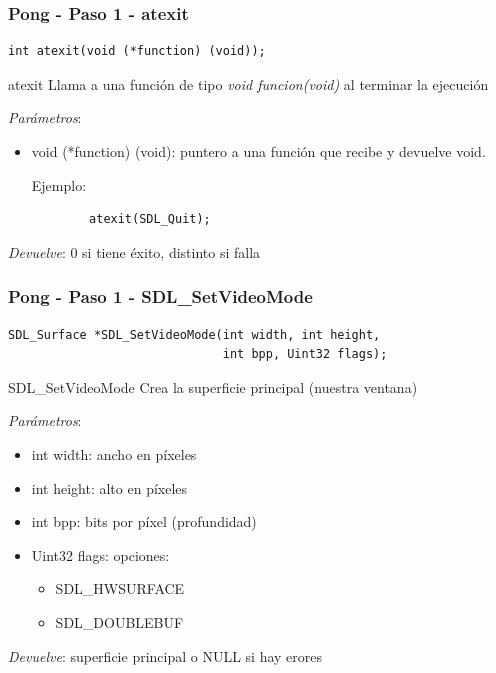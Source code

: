 \begin{frame}[fragile]
    \frametitle{Pong - Paso 1 - atexit}
	
\begin{verbatim}
int atexit(void (*function) (void));
\end{verbatim}

    \begin{block}{atexit}
	Llama a una función de tipo \emph{void funcion(void)} al terminar la ejecución
	
	\emph{Parámetros}:
	\begin{itemize}
	    \item void (*function) (void): puntero a una función que recibe y devuelve void.
	    
	    Ejemplo:
	    \begin{verbatim}
	    atexit(SDL_Quit);
	    \end{verbatim}
	\end{itemize}
	
	\emph{Devuelve}: $0$ si tiene éxito, distinto si falla
    \end{block}

\end{frame}

\begin{frame}[fragile]
    \frametitle{Pong - Paso 1 - SDL\_SetVideoMode}
	
\begin{verbatim}
SDL_Surface *SDL_SetVideoMode(int width, int height,
                              int bpp, Uint32 flags);
\end{verbatim}

    \begin{block}{SDL\_SetVideoMode}
	Crea la superficie principal (nuestra ventana)
	
	\emph{Parámetros}:
	\begin{itemize}
	    \item int width: ancho en píxeles
	    \item int height: alto en píxeles
	    \item int bpp: bits por píxel (profundidad)
	    \item Uint32 flags: opciones:
	    \begin{itemize}
		    \item SDL\_HWSURFACE
		    \item SDL\_DOUBLEBUF
	    \end{itemize}
	\end{itemize}
	
	\emph{Devuelve}: superficie principal o NULL si hay erores
    \end{block}

\end{frame}

